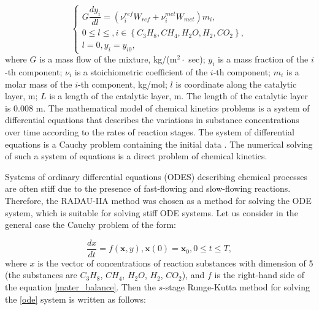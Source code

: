 \documentclass{svproc}
\begin{document}
\begin{equation}\label{mater_balance}
\begin{cases}
G \dfrac{dy_i}{dl} = \left(\nu_i^{ref} W_{ref} + \nu_i^{met} W_{met} \right) m_i, 
\\
0 \le l \le , i \in \left\lbrace C_3H_8, CH_4, H_2O, H_2, CO_2 \right\rbrace,
\\
l = 0, y_i = y_{i0},
\end{cases}
\end{equation}
where $G$ is a mass flow of the mixture, kg/(m$^2 \cdot$ sec); $y_i$ is a mass fraction of the $i$-th component; $\nu_i$ is a stoichiometric coefficient of the $i$-th component; $m_i$ is a molar mass of the $i$-th component, kg/mol; $l$ is coordinate along the catalytic layer, m; $L$ is a length of the catalytic layer, m. The length of the catalytic layer is 0.008 m. The mathematical model of chemical kinetics problems is a system of differential equations that describes the variations in substance concentrations over time according to the rates of reaction stages. The system of differential equations is a Cauchy problem containing the initial data \cite{Enikeev2020, Chainikova2017}. The numerical solving of such a system of equations is a direct problem of chemical kinetics. 


Systems of ordinary differential equations (ODES) describing chemical processes are often stiff due to the presence of fast-flowing and slow-flowing reactions. Therefore, the RADAU-IIA method was chosen as a method for solving the ODE system, which is suitable for solving stiff ODE systems. Let us consider in the general case the Cauchy problem of the form:

\begin{equation}\label{ode}
\dfrac{dx}{dt} = f(\textbf{x}, y), \textbf{x}(0) = \textbf{x}_0, 0 \le t \le T,
\end{equation}
where $x$ is the vector of concentrations of reaction substances with dimension of 5 (the substances are $C_3H_8$, $CH_4$, $H_2O$, $H_2$, $CO_2$), and $f$ is the right-hand side of the equation \eqref{mater_balance}. Then the $s$-stage Runge-Kutta method for solving the \eqref{ode} system is written as follows:
\end{document}
